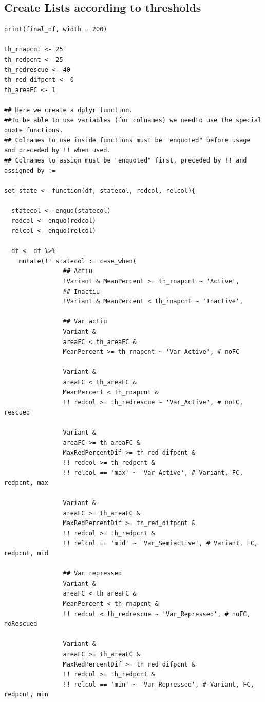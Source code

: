 \documentclass[11pt]{article}
\begin{document}
\subsection{Create Lists according to thresholds}
\label{sec:org76cdbb5}
\begin{verbatim}
print(final_df, width = 200)

th_rnapcnt <- 25
th_redpcnt <- 25
th_redrescue <- 40
th_red_difpcnt <- 0
th_areaFC <- 1

## Here we create a dplyr function.
##To be able to use variables (for colnames) we needto use the special quote functions.
## Colnames to use inside functions must be "enquoted" before usage and preceded by !! when used.
## Colnames to assign must be "enquoted" first, preceded by !! and assigned by :=

set_state <- function(df, statecol, redcol, relcol){

  statecol <- enquo(statecol)
  redcol <- enquo(redcol)
  relcol <- enquo(relcol)

  df <- df %>%
    mutate(!! statecol := case_when(
                ## Actiu
                !Variant & MeanPercent >= th_rnapcnt ~ 'Active',
                ## Inactiu
                !Variant & MeanPercent < th_rnapcnt ~ 'Inactive',

                ## Var actiu
                Variant &
                areaFC < th_areaFC &
                MeanPercent >= th_rnapcnt ~ 'Var_Active', # noFC

                Variant &
                areaFC < th_areaFC &
                MeanPercent < th_rnapcnt &
                !! redcol >= th_redrescue ~ 'Var_Active', # noFC, rescued

                Variant &
                areaFC >= th_areaFC &
                MaxRedPercentDif >= th_red_difpcnt &
                !! redcol >= th_redpcnt &
                !! relcol == 'max' ~ 'Var_Active', # Variant, FC, redpcnt, max

                Variant &
                areaFC >= th_areaFC &
                MaxRedPercentDif >= th_red_difpcnt &
                !! redcol >= th_redpcnt &
                !! relcol == 'mid' ~ 'Var_Semiactive', # Variant, FC, redpcnt, mid

                ## Var repressed
                Variant &
                areaFC < th_areaFC &
                MeanPercent < th_rnapcnt &
                !! redcol < th_redrescue ~ 'Var_Repressed', # noFC, noRescued

                Variant &
                areaFC >= th_areaFC &
                MaxRedPercentDif >= th_red_difpcnt &
                !! redcol >= th_redpcnt &
                !! relcol == 'min' ~ 'Var_Repressed', # Variant, FC, redpcnt, min


\end{verbatim}
\end{document}
